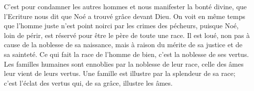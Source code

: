 C'est pour condamner les autres hommes et nous manifester la bonté divine,
	que l’Ecriture nous dit que Noé a trouvé grâce devant Dieu.
On voit en même temps que l’homme juste
	n’est point noirci par les crimes des pécheurs,
	puisque Noé, loin de périr,
	est réservé pour être le père de toute une race.
Il est loué, non pas à cause de la noblesse de sa naissance,
	mais à raison du mérite de sa justice et de sa sainteté.
Ce qui fait la race de l’homme de bien, c’est la noblesse de ses vertus.
Les familles humaines sont ennoblies par la noblesse de leur race,
	celle des âmes leur vient de leurs vertus.
	Une famille est illustre par la splendeur de sa race;
	c’est l’éclat des vertus qui, de sa grâce, illustre les âmes.
